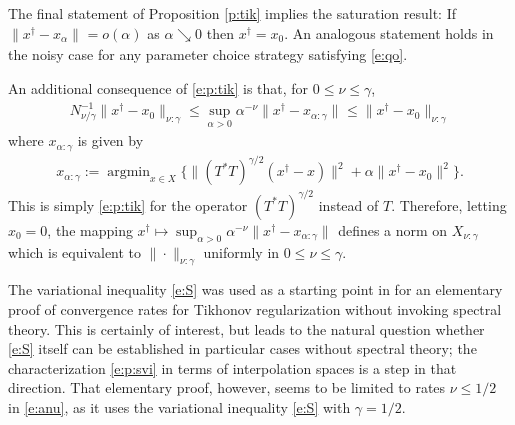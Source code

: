 \documentclass[10pt, a4paper]{iopart}
\newcommand{\norm}[2]{     \| #1       \|_{ #2 }}
\theoremstyle{remark}
\theoremstyle{definition}
\begin{document}

	The final statement of Proposition \ref{p:tik}
	implies the saturation result:
	If $\norm{x^\dagger - x_\alpha}{} = o(\alpha)$
	as $\alpha \searrow 0$
	then $x^\dagger = x_0$.
	An analogous statement holds 
	in the noisy case 
	for any
	parameter choice strategy
	satisfying \eqref{e:qo}.
	

	An additional consequence 
	of \eqref{e:p:tik}
	is that,
	for $0 \leq \nu \leq \gamma$,
	\begin{align}
	\label{e:c:tikr}
		N_{\nu/\gamma}^{-1}
		\norm{ x^\dag - x_0 }{\nu : \gamma}
		\leq
		\sup_{\alpha > 0}
		\alpha^{-\nu}
		\norm{ x^\dag - x_{\alpha:\gamma} }{}
		\leq
		\norm{ x^\dag - x_0 }{\nu : \gamma}
	\end{align}
	where $x_{\alpha:\gamma}$ is given by
	\begin{align}
	\label{e:c:tikr:x}
		x_{\alpha:\gamma} 
		:= 
		\mathop{\mathrm{argmin}}_{x \in X} 
		\{
			\norm{ (T^* T)^{\gamma/2} (x^\dag - x) }{}^2
			+
			\alpha
			\norm{ x^\dag - x_0 }{}^2
		\}
		.
	\end{align}
	This is simply \eqref{e:p:tik}
	for the operator
	$(T^* T)^{\gamma/2}$ instead of $T$.
	Therefore,
	letting $x_0 = 0$,
	the mapping
	$x^\dag \mapsto \sup_{\alpha > 0} \alpha^{-\nu} \norm{x^\dag - x_{\alpha:\gamma}}{}$
	defines a norm on $X_{\nu:\gamma}$
	which 
	is equivalent to $\norm{\cdot}{\nu:\gamma}$
	uniformly in $0 \leq \nu \leq \gamma$.


	The variational inequality \eqref{e:S}
	was used as a starting point in 
	\cite[Lemma 2(ii) \& Lemma 7]{AndreevElbauDeHoopLiuScherzer2015}
	for an elementary proof of
	convergence rates for Tikhonov regularization 
	without 
	invoking spectral theory.
	This is certainly of interest,
	but leads to the natural question 
	whether \eqref{e:S} itself
	can be established in particular cases 
	without spectral theory; 
	the characterization \eqref{e:p:svi}
	in terms of interpolation spaces
	is a step in that direction.
	That elementary proof, however,
	seems to be limited to rates $\nu \leq 1/2$ 
	in \eqref{e:anu},
	as it uses the variational inequality \eqref{e:S} 
	with $\gamma = 1/2$.

	
\end{document}
